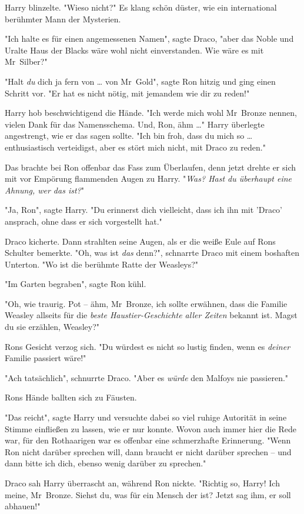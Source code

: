 {Harry blinzelte. "Wieso nicht?" Es klang schön düster, wie ein international berühmter Mann der Mysterien.

"Ich halte es für einen angemessenen Namen", sagte Draco, "aber das Noble und Uralte Haus der Blacks wäre wohl nicht einverstanden. Wie wäre es mit Mr~Silber?"

"Halt \emph{du} dich ja fern von … von Mr~Gold", sagte Ron hitzig und ging einen Schritt vor. "Er hat es nicht nötig, mit jemandem wie dir zu reden!"

Harry hob beschwichtigend die Hände. "Ich werde mich wohl Mr~Bronze nennen, vielen Dank für das Namensschema. Und, Ron, ähm …" Harry überlegte angestrengt, wie er das sagen sollte. "Ich bin froh, dass du mich so … enthusiastisch verteidigst, aber es stört mich nicht, mit Draco zu reden."

Das brachte bei Ron offenbar das Fass zum Überlaufen, denn jetzt drehte er sich mit vor Empörung flammenden Augen zu Harry. "\emph{Was? Hast du überhaupt eine Ahnung, wer das ist?}"

"Ja, Ron", sagte Harry. "Du erinnerst dich vielleicht, dass ich ihn mit 'Draco' ansprach, ohne dass er sich vorgestellt hat."

Draco kicherte. Dann strahlten seine Augen, als er die weiße Eule auf Rons Schulter bemerkte. "Oh, was ist \emph{das} denn?", schnarrte Draco mit einem boshaften Unterton. "Wo ist die berühmte Ratte der Weasleys?"

"Im Garten begraben", sagte Ron kühl.

"Oh, wie traurig. Pot -- ähm, Mr~Bronze, ich sollte erwähnen, dass die Familie Weasley allseits für die \emph{beste Haustier-Geschichte aller Zeiten} bekannt ist. Magst du sie erzählen, Weasley?"

Rons Gesicht verzog sich. "Du würdest es nicht so lustig finden, wenn es \emph{deiner} Familie passiert wäre!"

"Ach tatsächlich", schnurrte Draco. "Aber es \emph{würde} den Malfoys nie passieren."

Rons Hände ballten sich zu Fäusten.

"Das reicht", sagte Harry und versuchte dabei so viel ruhige Autorität in seine Stimme einfließen zu lassen, wie er nur konnte. Wovon auch immer hier die Rede war, für den Rothaarigen war es offenbar eine schmerzhafte Erinnerung. "Wenn Ron nicht darüber sprechen will, dann braucht er nicht darüber sprechen -- und dann bitte ich dich, ebenso wenig darüber zu sprechen."

Draco sah Harry überrascht an, während Ron nickte. "Richtig so, Harry! Ich meine, Mr~Bronze. Siehst du, was für ein Mensch der ist? Jetzt sag ihm, er soll abhauen!"

}
